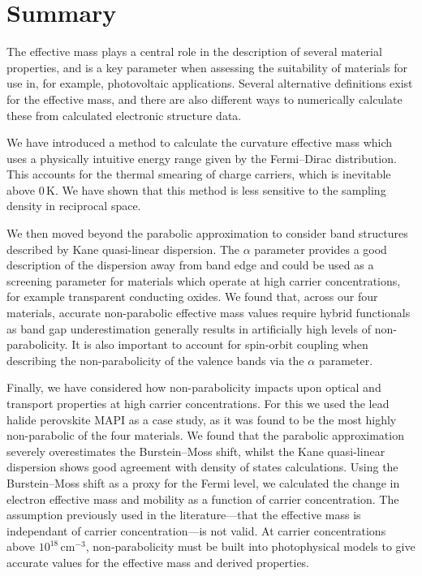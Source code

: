 \section{Summary}

The effective mass plays a central role in the description of several material properties, and is a key parameter when assessing the suitability of materials for use in, for example, photovoltaic applications. 
Several alternative definitions exist for the effective mass, and there are also different ways to numerically calculate these from calculated electronic structure data.

We have introduced a method to calculate the curvature effective mass which uses a physically intuitive energy range given by the Fermi--Dirac distribution. This accounts for the thermal smearing of charge carriers, which is inevitable above $0\,\mathrm{K}$.
We have shown that this method is less sensitive to the sampling density in reciprocal space.

We then moved beyond the parabolic approximation to consider band structures described by Kane quasi-linear dispersion.
The $\alpha$ parameter provides a good description of the dispersion away from band edge and could be used as a screening parameter for materials which operate at high carrier concentrations, for example transparent conducting oxides.
We found that, across our four materials, accurate non-parabolic effective mass values require hybrid functionals as band gap underestimation generally results in artificially high levels of non-parabolicity.
It is also important to account for spin-orbit coupling when describing the non-parabolicity of the valence bands via the $\alpha$ parameter.

Finally, we have considered how non-parabolicity impacts upon optical and transport properties at high carrier concentrations.
For this we used the lead halide perovskite MAPI as a case study, as it was found to be the most highly non-parabolic of the four materials.
We found that the parabolic approximation severely overestimates the Burstein--Moss shift, 
whilst the Kane quasi-linear dispersion shows good agreement with density of states calculations. 
Using the Burstein--Moss shift as a proxy for the Fermi level, we calculated the change in electron effective mass and mobility as a function of carrier concentration. 
The assumption previously used in the literature---that the effective mass is independant of carrier concentration---is not valid.
At carrier concentrations above $10^{18}\,\mathrm{cm}^{-3}$, non-parabolicity must be built into photophysical models to give accurate values for the effective mass and derived properties.

